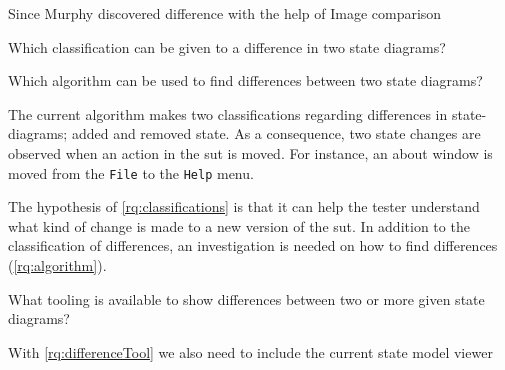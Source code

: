         Since Murphy discovered difference with the help of Image comparison
        
        \begin{questions}[resume]
            \item Which classification can be given to a difference in two state diagrams? \label{rq:classifications} 
            \begin{questions}
                \item Which algorithm can be used to find differences between two state diagrams? \label{rq:algorithm}    
            \end{questions}
        \end{questions}
        
        The current algorithm \cite{stateDiff} makes two classifications regarding differences in state-diagrams; added and removed state. As a consequence, two state changes are observed when an action in the \acrshort{sut} is moved. For instance, an about window is moved from the \verb|File| to the \verb|Help| menu. 
        
        The hypothesis of \ref{rq:classifications} is that it can help the tester understand what kind of change is made to a new version of the \acrshort{sut}. In addition to the classification of differences, an investigation is needed on how to find differences (\ref{rq:algorithm}).
        
        
        \begin{questions}[resume]
            \item What tooling is available to show differences between two or more given state diagrams? \label{rq:differenceTool}
        \end{questions}
        
        With \ref{rq:differenceTool} we also need to include the current state model viewer \cite{thesisMulders}
        
        
        
